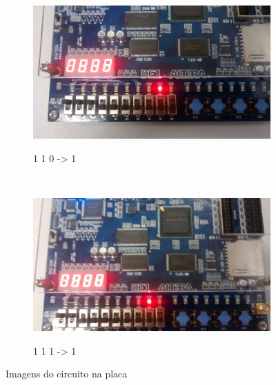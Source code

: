 \begin{figure}
		\begin{subfigure}[b]{0.44\textwidth}
	        \includegraphics[width=\textwidth]{img/cenario2/circ7}
	        \label{fig:circ7}
			\caption{1 1 0 -> 1}
	    \end{subfigure}
	    ~
	    \begin{subfigure}[b]{0.44\textwidth}
	        \includegraphics[width=\textwidth]{img/cenario2/circ8}
	        \label{fig:circ8}
			\caption{1 1 1 -> 1}
	    \end{subfigure}


	    \caption{Imagens do circuito na placa}\label{fig:fotosCircuito}
	\end{figure}


